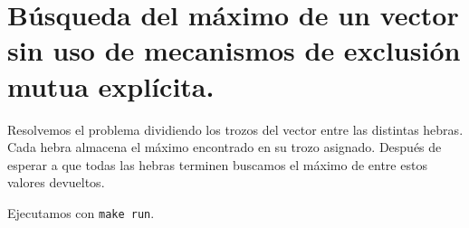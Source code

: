 \section{Búsqueda del máximo de un vector sin uso de mecanismos de exclusión mutua explícita.}

Resolvemos el problema dividiendo los trozos del vector entre las distintas hebras. Cada
hebra almacena el máximo encontrado en su trozo asignado. Después de esperar a que todas
las hebras terminen buscamos el máximo de entre estos valores devueltos.

Ejecutamos con \texttt{make run}.